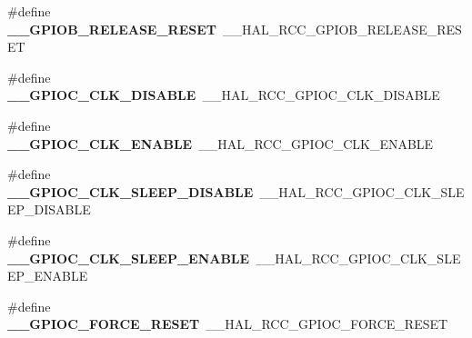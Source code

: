 \begin{DoxyCompactItemize}
\item 
\#define {\bfseries \+\_\+\+\_\+\+G\+P\+I\+O\+B\+\_\+\+R\+E\+L\+E\+A\+S\+E\+\_\+\+R\+E\+S\+ET}~\+\_\+\+\_\+\+H\+A\+L\+\_\+\+R\+C\+C\+\_\+\+G\+P\+I\+O\+B\+\_\+\+R\+E\+L\+E\+A\+S\+E\+\_\+\+R\+E\+S\+ET\hypertarget{group___h_a_l___r_c_c___aliased_ga87ff49df25db0b75b147e867febc2cbe}{}\label{group___h_a_l___r_c_c___aliased_ga87ff49df25db0b75b147e867febc2cbe}

\item 
\#define {\bfseries \+\_\+\+\_\+\+G\+P\+I\+O\+C\+\_\+\+C\+L\+K\+\_\+\+D\+I\+S\+A\+B\+LE}~\+\_\+\+\_\+\+H\+A\+L\+\_\+\+R\+C\+C\+\_\+\+G\+P\+I\+O\+C\+\_\+\+C\+L\+K\+\_\+\+D\+I\+S\+A\+B\+LE\hypertarget{group___h_a_l___r_c_c___aliased_ga3c482a89bbd8e0ce401003a6c9254e3e}{}\label{group___h_a_l___r_c_c___aliased_ga3c482a89bbd8e0ce401003a6c9254e3e}

\item 
\#define {\bfseries \+\_\+\+\_\+\+G\+P\+I\+O\+C\+\_\+\+C\+L\+K\+\_\+\+E\+N\+A\+B\+LE}~\+\_\+\+\_\+\+H\+A\+L\+\_\+\+R\+C\+C\+\_\+\+G\+P\+I\+O\+C\+\_\+\+C\+L\+K\+\_\+\+E\+N\+A\+B\+LE\hypertarget{group___h_a_l___r_c_c___aliased_gac7ba91faf1c5236aec74293ecd543657}{}\label{group___h_a_l___r_c_c___aliased_gac7ba91faf1c5236aec74293ecd543657}

\item 
\#define {\bfseries \+\_\+\+\_\+\+G\+P\+I\+O\+C\+\_\+\+C\+L\+K\+\_\+\+S\+L\+E\+E\+P\+\_\+\+D\+I\+S\+A\+B\+LE}~\+\_\+\+\_\+\+H\+A\+L\+\_\+\+R\+C\+C\+\_\+\+G\+P\+I\+O\+C\+\_\+\+C\+L\+K\+\_\+\+S\+L\+E\+E\+P\+\_\+\+D\+I\+S\+A\+B\+LE\hypertarget{group___h_a_l___r_c_c___aliased_ga3ea55b79a7a043bac63c10aa18d9a3ec}{}\label{group___h_a_l___r_c_c___aliased_ga3ea55b79a7a043bac63c10aa18d9a3ec}

\item 
\#define {\bfseries \+\_\+\+\_\+\+G\+P\+I\+O\+C\+\_\+\+C\+L\+K\+\_\+\+S\+L\+E\+E\+P\+\_\+\+E\+N\+A\+B\+LE}~\+\_\+\+\_\+\+H\+A\+L\+\_\+\+R\+C\+C\+\_\+\+G\+P\+I\+O\+C\+\_\+\+C\+L\+K\+\_\+\+S\+L\+E\+E\+P\+\_\+\+E\+N\+A\+B\+LE\hypertarget{group___h_a_l___r_c_c___aliased_ga4a8f5c33409a5639f17aeed39a22f91c}{}\label{group___h_a_l___r_c_c___aliased_ga4a8f5c33409a5639f17aeed39a22f91c}

\item 
\#define {\bfseries \+\_\+\+\_\+\+G\+P\+I\+O\+C\+\_\+\+F\+O\+R\+C\+E\+\_\+\+R\+E\+S\+ET}~\+\_\+\+\_\+\+H\+A\+L\+\_\+\+R\+C\+C\+\_\+\+G\+P\+I\+O\+C\+\_\+\+F\+O\+R\+C\+E\+\_\+\+R\+E\+S\+ET\hypertarget{group___h_a_l___r_c_c___aliased_ga63ef2f2f1329d2647e8659b912e4e9c4}{}\label{group___h_a_l___r_c_c___aliased_ga63ef2f2f1329d2647e8659b912e4e9c4}


\end{DoxyCompactItemize}
